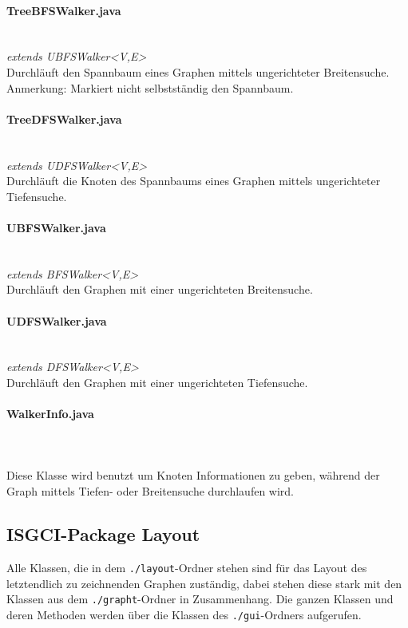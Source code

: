 \documentclass[10pt,a4paper]{article}
\begin{document}
\paragraph{TreeBFSWalker.java}\ \\
\emph{ extends UBFSWalker<V,E>}\\
Durchläuft den Spannbaum eines Graphen mittels ungerichteter Breitensuche. Anmerkung: Markiert nicht selbstständig den Spannbaum.\\
\paragraph{TreeDFSWalker.java}\ \\
\emph{extends UDFSWalker<V,E>}\\
Durchläuft die Knoten des Spannbaums eines Graphen mittels ungerichteter Tiefensuche.\\
\paragraph{UBFSWalker.java}\ \\
\emph{ extends BFSWalker<V,E>}\\
Durchläuft den Graphen mit einer ungerichteten Breitensuche.\\
\paragraph{UDFSWalker.java}\ \\
\emph{extends DFSWalker<V,E>}\\
Durchläuft den Graphen mit einer ungerichteten Tiefensuche.\\
\paragraph{WalkerInfo.java}\ \\
\emph{}\\
Diese Klasse wird benutzt um Knoten Informationen zu geben, während der Graph mittels Tiefen- oder Breitensuche durchlaufen wird.

\subsection{ISGCI-Package Layout}

Alle Klassen, die in dem \texttt{./layout}-Ordner stehen sind für das Layout des letztendlich zu zeichnenden Graphen zuständig, dabei stehen diese stark mit den Klassen aus dem \texttt{./grapht}-Ordner in Zusammenhang. Die ganzen Klassen und deren Methoden werden über die Klassen des \texttt{./gui}-Ordners aufgerufen.
\end{document}
